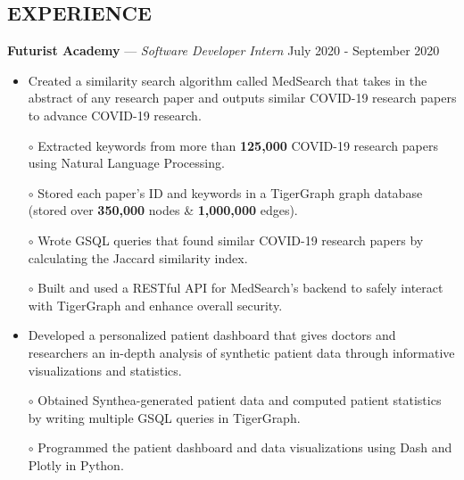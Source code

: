 \documentclass[11pt]{res}
\begin{document}
\begin{footnotesize}
\begin{resume}
\begin{small}
\section{EXPERIENCE}
\end{small}
\vspace{.5mm}
\textbf{Futurist Academy} — {\sl Software Developer Intern} \hfill July 2020 - September 2020\vspace{-5mm}
\begin{itemize}[leftmargin=6.25mm]
\item Created a similarity search algorithm called MedSearch that takes in the abstract of any research paper and outputs similar COVID-19 research papers to advance COVID-19 research.
\end{itemize}
\vspace{-6.4mm}
\begin{itemize} \itemsep -2pt 
\item[$\circ$] Extracted keywords from more than \textbf{125,000} COVID-19 research papers using Natural Language Processing.
\vspace{1mm}
\item[$\circ$] Stored each paper's ID and keywords in a TigerGraph graph database (stored over \textbf{350,000} nodes \& \textbf{1,000,000} edges).
\vspace{1mm}
\item[$\circ$] Wrote GSQL queries that found similar COVID-19 research papers by calculating the Jaccard similarity index.
\vspace{1mm}
\item[$\circ$] Built and used a RESTful API for MedSearch's backend to safely interact with TigerGraph and enhance overall security.
\end{itemize}
\vspace{-6mm}
\begin{itemize}[leftmargin=6.25mm]
\item Developed a personalized patient dashboard that gives doctors and researchers an in-depth analysis of synthetic patient data through informative visualizations and statistics.
\end{itemize}
\vspace{-6.95mm}
\begin{itemize} \itemsep -2pt 
\item[$\circ$] Obtained Synthea-generated patient data and computed patient statistics by writing multiple GSQL queries in TigerGraph.
\vspace{1mm}
\item[$\circ$] Programmed the patient dashboard and data visualizations using Dash and Plotly in Python.

\end{itemize}
\end{resume}
\end{footnotesize}
\end{document}
